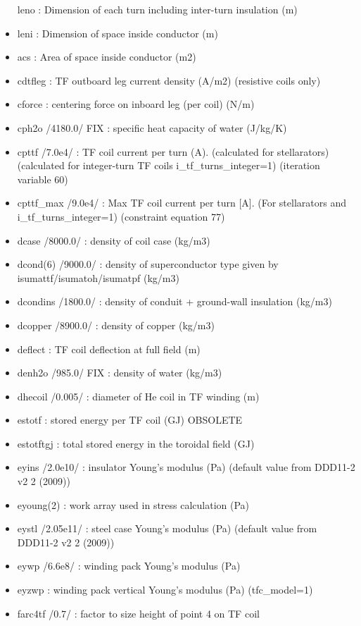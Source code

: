 \documentclass[]{article}
\begin{document}
\begin{itemize}
  leno : Dimension of each turn including inter-turn insulation (m)
\item
  leni : Dimension of space inside conductor (m)
\item
  acs : Area of space inside conductor (m2)
\item
  cdtfleg : TF outboard leg current density (A/m2) (resistive coils
  only)
\item
  cforce : centering force on inboard leg (per coil) (N/m)
\item
  cph2o /4180.0/ FIX : specific heat capacity of water (J/kg/K)
\item
  cpttf /7.0e4/ : TF coil current per turn (A). (calculated for
  stellarators) (calculated for integer-turn TF coils
  i\_tf\_turns\_integer=1) (iteration variable 60)
\item
  cpttf\_max /9.0e4/ : Max TF coil current per turn {[}A{]}. (For
  stellarators and i\_tf\_turns\_integer=1) (constraint equation 77)
\item
  dcase /8000.0/ : density of coil case (kg/m3)
\item
  dcond(6) /9000.0/ : density of superconductor type given by
  isumattf/isumatoh/isumatpf (kg/m3)
\item
  dcondins /1800.0/ : density of conduit + ground-wall insulation
  (kg/m3)
\item
  dcopper /8900.0/ : density of copper (kg/m3)
\item
  deflect : TF coil deflection at full field (m)
\item
  denh2o /985.0/ FIX : density of water (kg/m3)
\item
  dhecoil /0.005/ : diameter of He coil in TF winding (m)
\item
  estotf : stored energy per TF coil (GJ) OBSOLETE
\item
  estotftgj : total stored energy in the toroidal field (GJ)
\item
  eyins /2.0e10/ : insulator Young's modulus (Pa) (default value from
  DDD11-2 v2 2 (2009))
\item
  eyoung(2) : work array used in stress calculation (Pa)
\item
  eystl /2.05e11/ : steel case Young's modulus (Pa) (default value from
  DDD11-2 v2 2 (2009))
\item
  eywp /6.6e8/ : winding pack Young's modulus (Pa)
\item
  eyzwp : winding pack vertical Young's modulus (Pa) (tfc\_model=1)
\item
  farc4tf /0.7/ : factor to size height of point 4 on TF coil

\end{itemize}
\end{document}
